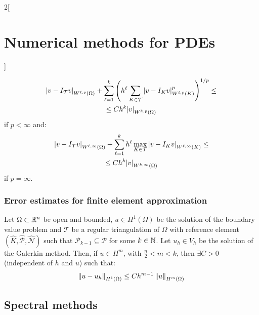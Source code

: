 \documentclass[../../../main_math.tex]{subfiles}
\begin{document}
\begin{multicols}{2}[\section{Numerical methods for PDEs}]
\begin{theorem}
    \begin{multline*}
      \abs{v-I_\mathcal{T}v}_{W^{\ell,p}(\Omega)}+\sum_{\ell=1}^k\left(h^\ell\sum_{K\in\mathcal{T}} \abs{v-I_Kv}_{W^{\ell,p}(K)}^p\right)^{1/p}\leq \\\leq C h^k\abs{v}_{W^{k,p}(\Omega)}
    \end{multline*}
    if $p<\infty$ and:
    \begin{multline*}
      \abs{v-I_\mathcal{T}v}_{W^{\ell,\infty}(\Omega)}+\sum_{\ell=1}^kh^\ell \max_{K\in\mathcal{T}}\abs{v-I_Kv}_{W^{\ell,\infty}(K)}\leq\\\leq C h^k\abs{v}_{W^{k,\infty}(\Omega)}
    \end{multline*}
    if $p=\infty$.
  \end{theorem}
  \subsubsection{Error estimates for finite element approximation}
  \begin{theorem}
    Let $\Omega\subset\mathbb{R}^n$ be open and bounded, $u\in H^1(\Omega)$ be the solution of the boundary value problem and $\mathcal{T}$ be a regular triangulation of $\Omega$ with reference element $(\widehat{K}, \widehat{\mathcal{P}}, \widehat{\mathcal{N}})$ such that $\mathcal{P}_{k-1}\subseteq \mathcal{P}$ for some $k\in\mathbb{N}$. Let $u_h\in V_h$ be the solution of the Galerkin method. Then, if $u\in H^m$, with $\frac{n}{2}< m<k$, then $\exists C>0$ (independent of $h$ and $u$) such that:
    $$
      \left\|u-u_h\right\|_{H^1(\Omega)}\leq C h^{m-1}\left\|u\right\|_{H^m(\Omega)}
    $$
  \end{theorem}
  \subsection{Spectral methods}
\end{multicols}
\end{document}
